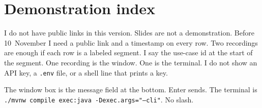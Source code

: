 \documentclass[11pt]{article}
\begin{document}
\section{Demonstration index}
\label{sec:demos}

I do not have public links in this version. Slides are not a demonstration. Before 10~November I need a public link and a timestamp on every row. Two recordings are enough if each row is a labeled segment. I say the use-case id at the start of the segment. One recording is the window. One is the terminal. I do not show an API key, a \texttt{.env} file, or a shell line that prints a key.

The window box is the message field at the bottom. Enter sends. The terminal is \texttt{./mvnw compile exec:java -Dexec.args="--cli"}. No slash.
\end{document}
